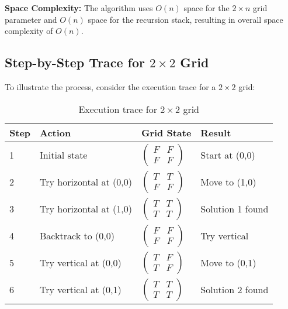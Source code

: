 \documentclass[conference]{IEEEtran}
\begin{document}
\textbf{Space Complexity:} The algorithm uses $O(n)$ space for the $2 \times n$ grid parameter and $O(n)$ space for the recursion stack, resulting in overall space complexity of $O(n)$.

\subsection{Step-by-Step Trace for $2 \times 2$ Grid}

To illustrate the process, consider the execution trace for a $2 \times 2$ grid:

\begin{table}[htbp]
\centering
\caption{Execution trace for $2 \times 2$ grid}
\label{tab:trace}
\renewcommand{\arraystretch}{2.0} %
\begin{tabular}{|p{0.7cm}|p{2.2cm}|p{1.8cm}|p{2.0cm}|}
\hline
\textbf{Step} & \textbf{Action} & \textbf{Grid State} & \textbf{Result} \\
\hline
1 & Initial state & $\begin{pmatrix} F & F \\ F & F \end{pmatrix}$ & Start at (0,0) \\
\hline
2 & Try horizontal at (0,0) & $\begin{pmatrix} T & T \\ F & F \end{pmatrix}$ & Move to (1,0) \\
\hline
3 & Try horizontal at (1,0) & $\begin{pmatrix} T & T \\ T & T \end{pmatrix}$ & Solution 1 found \\
\hline
4 & Backtrack to (0,0) & $\begin{pmatrix} F & F \\ F & F \end{pmatrix}$ & Try vertical \\
\hline
5 & Try vertical at (0,0) & $\begin{pmatrix} T & F \\ T & F \end{pmatrix}$ & Move to (0,1) \\
\hline
6 & Try vertical at (0,1) & $\begin{pmatrix} T & T \\ T & T \end{pmatrix}$ & Solution 2 found \\
\hline
\end{tabular}
\end{table}
\end{document}

